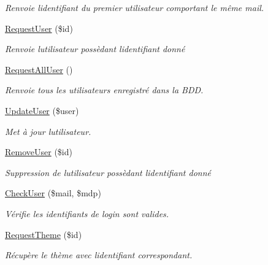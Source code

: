 \begin{DoxyCompactItemize}
\begin{DoxyCompactList}\small\item\em Renvoie l\textquotesingle{}identifiant du premier utilisateur comportant le même mail. \end{DoxyCompactList}\item 
\mbox{\hyperlink{class_interface_b_d_d_a3069460bb26daac4b0777cb763ab198a}{Request\+User}} (\$id)
\begin{DoxyCompactList}\small\item\em Renvoie l\textquotesingle{}utilisateur possèdant l\textquotesingle{}identifiant donné \end{DoxyCompactList}\item 
\mbox{\hyperlink{class_interface_b_d_d_a3dea4aa280dafa70b190e859df68c1b4}{Request\+All\+User}} ()
\begin{DoxyCompactList}\small\item\em Renvoie tous les utilisateurs enregistré dans la B\+DD. \end{DoxyCompactList}\item 
\mbox{\hyperlink{class_interface_b_d_d_abf7f8811487ce2a1626969ffbfcf7701}{Update\+User}} (\$user)
\begin{DoxyCompactList}\small\item\em Met à jour l\textquotesingle{}utilisateur. \end{DoxyCompactList}\item 
\mbox{\hyperlink{class_interface_b_d_d_a1ce1781e4e653de271446486898f360e}{Remove\+User}} (\$id)
\begin{DoxyCompactList}\small\item\em Suppression de l\textquotesingle{}utilisateur possèdant l\textquotesingle{}identifiant donné \end{DoxyCompactList}\item 
\mbox{\hyperlink{class_interface_b_d_d_aaa494b0483c328eae0da048fcec610d1}{Check\+User}} (\$mail, \$mdp)
\begin{DoxyCompactList}\small\item\em Vérifie les identifiants de login sont valides. \end{DoxyCompactList}\item 
\mbox{\hyperlink{class_interface_b_d_d_a03ff86215559d5aa319c416aaa5a3f46}{Request\+Theme}} (\$id)
\begin{DoxyCompactList}\small\item\em Récupère le thème avec l\textquotesingle{}identifiant correspondant. \end{DoxyCompactList}\item 

\end{DoxyCompactItemize}
